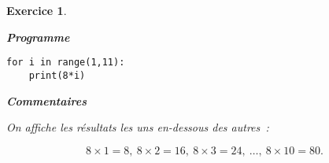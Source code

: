 \documentclass[10pt]{article}
\newtheorem{exo}{Exercice}
\begin{document}
\begin{exo}
~{}

\setlength{\columnseprule}{1pt}

\begin{multicols}{2}

\begin{center}
\textbf{Programme}
\end{center}

\begin{lstlisting}
for i in range(1,11):
	print(8*i)
\end{lstlisting}








\columnbreak

\begin{center}
\textbf{Commentaires}
\end{center}

On affiche les résultats les uns en-dessous des autres~:

\[8\times 1=8,~8\times 2=16,~8\times 3=24,~\dots,~8\times 10=80.\]

\end{multicols}

\end{exo}

\end{document}
